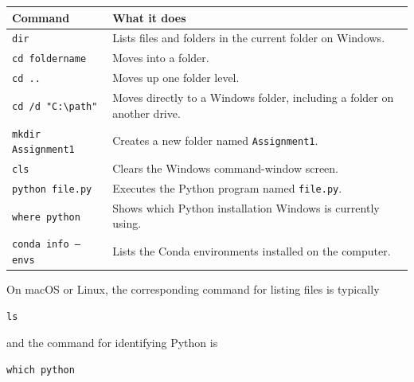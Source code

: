 \documentclass[11pt]{article}
\begin{document}
\begin{center}

{\small
\renewcommand{\arraystretch}{1.18}

\begin{tabularx}{0.96\linewidth}{@{}P{1.80in}Y@{}}

\toprule

\textbf{Command} & \textbf{What it does} \\

\midrule

\texttt{dir}
&
Lists files and folders in the current folder on Windows.
\\

\texttt{cd foldername}
&
Moves into a folder.
\\

\texttt{cd ..}
&
Moves up one folder level.
\\

\texttt{cd /d "C:\textbackslash path"}
&
Moves directly to a Windows folder, including a folder on another drive.
\\

\texttt{mkdir Assignment1}
&
Creates a new folder named \texttt{Assignment1}.
\\

\texttt{cls}
&
Clears the Windows command-window screen.
\\

\texttt{python file.py}
&
Executes the Python program named \texttt{file.py}.
\\

\texttt{where python}
&
Shows which Python installation Windows is currently using.
\\

\texttt{conda info --envs}
&
Lists the Conda environments installed on the computer.
\\

\bottomrule

\end{tabularx}
}

\end{center}

On macOS or Linux, the corresponding command for listing files is
typically

\begin{lstlisting}
ls
\end{lstlisting}

and the command for identifying Python is

\begin{lstlisting}
which python
\end{lstlisting}
\end{document}
